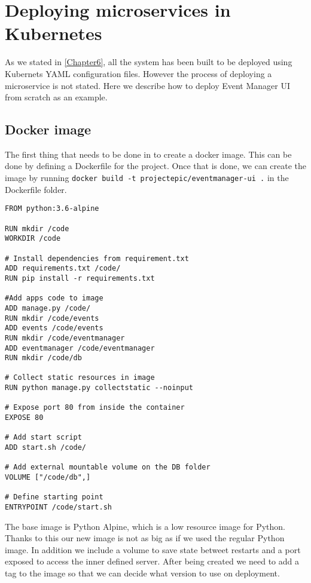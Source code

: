 
\chapter{Deploying microservices in Kubernetes} %

\label{AppendixB} %

As we stated in \autoref{Chapter6}, all the system has been built to be deployed using Kubernets YAML configuration files. However the process of deploying a microservice is not stated. Here we describe how to deploy Event Manager UI from scratch as an example.

\section{Docker image}

The first thing that needs to be done in to create a docker image. This can be done by defining a Dockerfile for the project. Once that is done, we can create the image by running \texttt{docker build -t projectepic/eventmanager-ui .} in the Dockerfile folder.

\begin{lstlisting}[]
FROM python:3.6-alpine

RUN mkdir /code
WORKDIR /code

# Install dependencies from requirement.txt
ADD requirements.txt /code/
RUN pip install -r requirements.txt

#Add apps code to image
ADD manage.py /code/
RUN mkdir /code/events
ADD events /code/events
RUN mkdir /code/eventmanager
ADD eventmanager /code/eventmanager
RUN mkdir /code/db

# Collect static resources in image
RUN python manage.py collectstatic --noinput

# Expose port 80 from inside the container
EXPOSE 80

# Add start script
ADD start.sh /code/

# Add external mountable volume on the DB folder
VOLUME ["/code/db",]

# Define starting point
ENTRYPOINT /code/start.sh
\end{lstlisting}

The base image is Python Alpine, which is a low resource image for Python. Thanks to this our new image is not as big as if we used the regular Python image. In addition we include a volume to save state betweet restarts and a port exposed to access the inner defined server. After being created we need to add a tag to the image so that we can decide what version to use on deployment.

